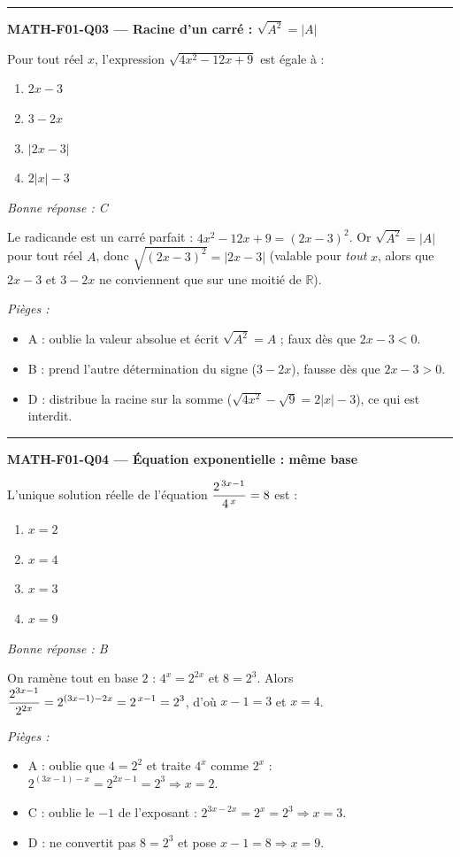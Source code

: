 \documentclass[11pt,a4paper]{article}
\newcommand{\R}{\mathbb{R}}\newcommand{\N}{\mathbb{N}}\newcommand{\Z}{\mathbb{Z}}
\begin{document}
\vspace{8pt}\hrule\vspace{8pt}
\noindent\textbf{MATH-F01-Q03 --- Racine d'un carré : $\sqrt{A^2}=|A|$}\par
Pour tout r\'eel $x$, l'expression $\sqrt{4x^{2}-12x+9}$ est \'egale \`a :
\begin{enumerate}[label=\Alph*)]
\item $2x-3$
\item $3-2x$
\item $|2x-3|$
\item $2|x|-3$
\end{enumerate}
\textit{Bonne réponse : C}\par
Le radicande est un carr\'e parfait : $4x^{2}-12x+9=(2x-3)^{2}$. Or $\sqrt{A^{2}}=|A|$ pour tout r\'eel $A$, donc $\sqrt{(2x-3)^{2}}=|2x-3|$ (valable pour \emph{tout} $x$, alors que $2x-3$ et $3-2x$ ne conviennent que sur une moiti\'e de $\R$).\par
\textit{Pièges :}
\begin{itemize}
\item A : oublie la valeur absolue et \'ecrit $\sqrt{A^{2}}=A$ ; faux d\`es que $2x-3<0$.
\item B : prend l'autre d\'etermination du signe ($3-2x$), fausse d\`es que $2x-3>0$.
\item D : distribue la racine sur la somme ($\sqrt{4x^{2}}-\sqrt{9}=2|x|-3$), ce qui est interdit.
\end{itemize}
\vspace{8pt}\hrule\vspace{8pt}
\noindent\textbf{MATH-F01-Q04 --- Équation exponentielle : même base}\par
L'unique solution r\'eelle de l'\'equation $\displaystyle\frac{2^{\,3x-1}}{4^{\,x}}=8$ est :
\begin{enumerate}[label=\Alph*)]
\item $x=2$
\item $x=4$
\item $x=3$
\item $x=9$
\end{enumerate}
\textit{Bonne réponse : B}\par
On ram\`ene tout en base $2$ : $4^{x}=2^{2x}$ et $8=2^{3}$. Alors $\displaystyle\frac{2^{3x-1}}{2^{2x}}=2^{(3x-1)-2x}=2^{\,x-1}=2^{3}$, d'o\`u $x-1=3$ et $x=4$.\par
\textit{Pièges :}
\begin{itemize}
\item A : oublie que $4=2^2$ et traite $4^x$ comme $2^x$ : $2^{(3x-1)-x}=2^{2x-1}=2^3\Rightarrow x=2$.
\item C : oublie le \guillemotleft{} $-1$ \guillemotright{} de l'exposant : $2^{3x-2x}=2^{x}=2^3\Rightarrow x=3$.
\item D : ne convertit pas $8=2^3$ et pose $x-1=8\Rightarrow x=9$.
\end{itemize}
\end{document}
